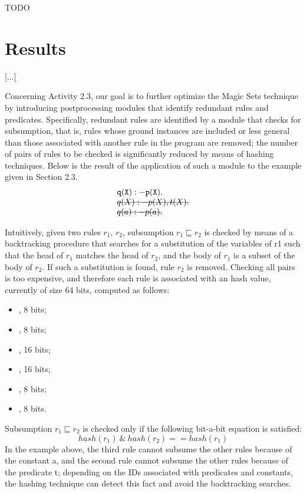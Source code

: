\documentclass[oneside]{book}
\newcommand{\stkout}[1]{\ifmmode\text{\sout{\ensuremath{#1}}}\else\sout{#1}\fi}
\begin{document}
TODO


\chapter{Results}
[...]

Concerning Activity 2.3, our goal is to further optimize the Magic Sets technique by introducing postprocessing modules that identify redundant rules and predicates. Specifically, redundant rules are identified by a module that checks for subsumption, that is, rules whose ground instances are included or less general than those associated with another rule in the program are removed; the number of pairs of rules to be checked is significantly reduced by means of hashing techniques. Below is the result of the application of such a module to the example given in Section 2.3. 
\[
\begin{array}{l}
{\tt q(X) :- p(X).}\\
\mathtt{\stkout{q(X) :- p(X), t(X).}}\\
\mathtt{\stkout{ q(a) :- p(a).}}\\
\end{array}
\]


Intuitively, given two rules $r_1$, $r_2$, subsumption $r_1 \sqsubseteq r_2$ is checked by means of a backtracking procedure that searches for a substitution of the variables of r1 such that the head of $r_1$ matches the head of $r_2$, and the body of $r_1$ is a subset of the body of $r_2$. If such a substitution is found, rule  $r_2$ is removed. Checking all pairs is too expensive, and therefore each rule is associated with an hash value, currently of size 64 bits, computed as follows:
\begin{itemize}
\item <OR of IDs of head predicates>, 8 bits;
\item <OR of IDs of head constants>, 8 bits;
\item <OR of IDs of predicates in positive body>, 16 bits;
\item <OR of IDs of constants in positive body>, 16 bits;
\item <OR of IDs of predicates in negative body>, 8 bits;
\item <OR of IDs of constants in negative body>, 8 bits.
\end{itemize}
Subsumption $r_1 \sqsubseteq r_2$ is checked only if the following bit-a-bit equation is satisfied:
$$hash(r_1) \ \& \ hash(r_2) == hash(r_1)$$
In the example above, the third rule cannot subsume the other rules because of the constant a, and the second rule cannot subsume the other rules because of the predicate t; depending on the IDs associated with predicates and constants, the hashing technique can detect this fact and avoid the backtracking searches.
\end{document}
